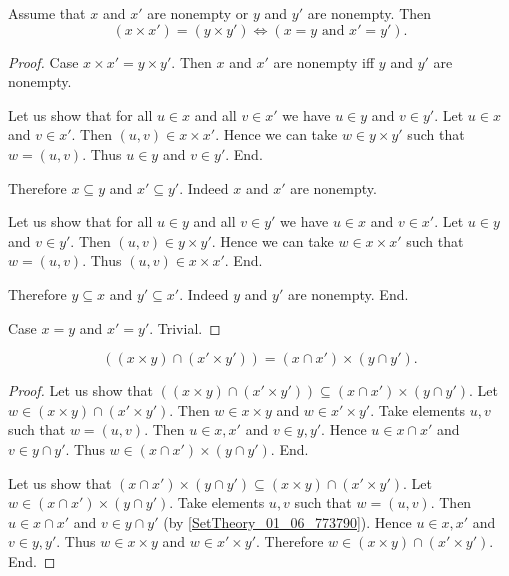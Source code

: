 \documentclass[../../set-theory.ftl.tex]{subfiles}
\begin{document}
\begin{forthel}
    \begin{proposition}\label{SetTheory_01_06_472623}
      Assume that $x$ and $x'$ are nonempty or $y$ and $y'$ are nonempty.
      Then \[ (x \times x') = (y \times y') \iff (\text{$x = y$ and $x' = y'$}). \]
    \end{proposition}
    \begin{proof}
      Case $x \times x' = y \times y'$.
        Then $x$ and $x'$ are nonempty iff $y$ and $y'$ are nonempty.

        Let us show that for all $u \in x$ and all $v \in x'$ we have $u \in y$ and $v \in y'$.
          Let $u \in x$ and $v \in x'$.
          Then $(u,v) \in x \times x'$.
          Hence we can take $w \in y \times y'$ such that $w = (u,v)$.
          Thus $u \in y$ and $v \in y'$.
        End.

        Therefore $x \subseteq y$ and $x' \subseteq y'$.
        Indeed $x$ and $x'$ are nonempty.

        Let us show that for all $u \in y$ and all $v \in y'$ we have $u \in x$ and $v \in x'$.
          Let $u \in y$ and $v \in y'$.
          Then $(u,v) \in y \times y'$.
          Hence we can take $w \in x \times x'$ such that $w = (u,v)$.
          Thus $(u,v) \in x \times x'$.
        End.

        Therefore $y \subseteq x$ and $y' \subseteq x'$.
        Indeed $y$ and $y'$ are nonempty.
      End.

      Case $x = y$ and $x' = y'$. Trivial.
    \end{proof}

    \begin{proposition}\label{SetTheory_01_06_261950}
      \[ ((x \times y) \cap (x' \times y')) = (x \cap x') \times (y \cap y'). \]
    \end{proposition}
    \begin{proof}
      Let us show that $((x \times y) \cap (x' \times y')) \subseteq (x \cap x') \times (y \cap y')$.
        Let $w \in (x \times y) \cap (x' \times y')$.
        Then $w \in x \times y$ and $w \in x' \times y'$.
        Take elements $u,v$ such that $w = (u,v)$.
        Then $u \in x,x'$ and $v \in y,y'$.
        Hence $u \in x \cap x'$ and $v \in y \cap y'$.
        Thus $w \in (x \cap x') \times (y \cap y')$.
      End.

      Let us show that $(x \cap x') \times (y \cap y') \subseteq (x \times y) \cap (x' \times y')$.
        Let $w \in (x \cap x') \times (y \cap y')$.
        Take elements $u,v$ such that $w = (u,v)$.
        Then $u \in x \cap x'$ and $v \in y \cap y'$ (by \ref{SetTheory_01_06_773790}).
        Hence $u \in x,x'$ and $v \in y,y'$.
        Thus $w \in x \times y$ and $w \in x' \times y'$.
        Therefore $w \in (x \times y) \cap (x' \times y')$.
      End.
    \end{proof}


\end{forthel}
\end{document}
